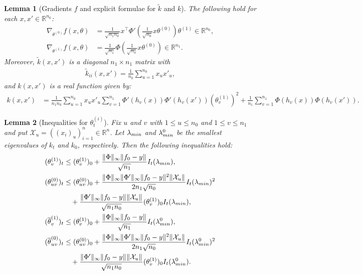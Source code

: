 \documentclass[10pt,a4paper]{amsart}
\newtheorem{lem}{Lemma}
\newcommand{\R}{\mathbb{R}}
\newcommand{\X}{\mathcal{X}}
\newcommand{\lammin}{\lambda_{\textup{min}}}
\newcommand{\norm}[2]{
    \|#1\|_{#2}
}
\begin{document}
\begin{lem}[Gradients $f$ and explicit formulae for $\tilde k$ and $k$]
    \label{lemma1}
    The following hold for each $x,x'\in \R^{n_0}$:
    \begin{align}
        \nabla_{\theta^{(0)}}f(x,\theta) &= \frac{1}{\sqrt{n_1n_0}}x^\top\Phi'(\frac{1}{\sqrt{n_0}}x\theta^{(0)})\theta^{(1)} \in \R^{n_0}, \\
        \nabla_{\theta^{(1)}}f(x,\theta) &= \frac{1}{\sqrt{n_1}}\Phi(\frac{1}{\sqrt{n_0}}x\theta^{(0)}) \in \R^{n_1}.
    \end{align}
    Moreover, $\tilde k(x,x')$ is a diagonal $n_1 \times n_1$ matrix with
    \begin{align}
        \tilde k_{ii}(x,x') = \frac{1}{n_0}\sum_{u=1}^{n_0}x_ux'_u,
    \end{align}
    and $k(x,x')$ is a real function given by:
    \begin{align}
        k(x,x') &=\frac{1}{n_1n_0}\sum_{u=1}^{n_0} x_ux'_u \sum_{v=1}^{n_1}\Phi'(h_v(x))\Phi'(h_v(x'))(\theta^{(1)}_v)^2 + \frac{1}{n_1}\sum_{v=1}^{n_1}\Phi(h_v(x))\Phi(h_v(x')).
    \end{align}
\end{lem}

    \begin{lem}[Inequalities for $\theta^{(i)}_t$]
        \label{lem:gronwallbeta}
        Fix $u$ and $v$ with $1 \le u \le n_0$ and $1 \le v \le n_1$ and put $\X_u = ((x_i)_u)_{i=1}^n\in \R^n$.
        Let $\lammin$ and $\lammin^0$ be the smallest eigenvalues of $k_t$ and $k_0$, respectively.
        Then the following inequalities hold:
        \begin{align}
            (\theta^{(1)}_v)_t &\le (\theta_v^{(1)})_0 + \frac{\norm{\Phi}{\infty}\norm{f_0-y}{}}{\sqrt{n_1}}I_t(\lammin),\\
            (\theta^{(0)}_{uv})_t &\le (\theta_{uv}^{(0)})_0 + \frac{\norm{\Phi}{\infty}\norm{\Phi'}{\infty}\norm{f_0-y}{}^2\norm{\X_u}{}}{2n_1\sqrt{n_0}}I_t(\lammin)^2\\
        &\quad + \frac{\norm{\Phi'}{\infty}\norm{f_0-y}{}\norm{\X_u}{}}{\sqrt{n_1n_0}}(\theta^{(1)}_v)_0{}I_t(\lammin),\\
        (\overline \theta^{(1)}_v)_t &\le (\theta_v^{(1)})_0 + \frac{\norm{\Phi}{\infty}\norm{f_0-y}{}}{\sqrt{n_1}}I_t(\lammin^0),\\
        (\overline \theta^{(0)}_{uv})_t &\le (\theta_{uv}^{(0)})_0 + \frac{\norm{\Phi}{\infty}\norm{\Phi'}{\infty}\norm{f_0-y}{}^2\norm{\X_u}{}}{2n_1\sqrt{n_0}}I_t(\lammin^0)^2 \\
    &\quad + \frac{\norm{\Phi'}{\infty}\norm{f_0-y}{}\norm{\X_u}{}}{\sqrt{n_1n_0}}(\theta^{(1)}_v)_0{}I_t(\lammin^0).
\end{align}
    \end{lem} 
\end{document}
